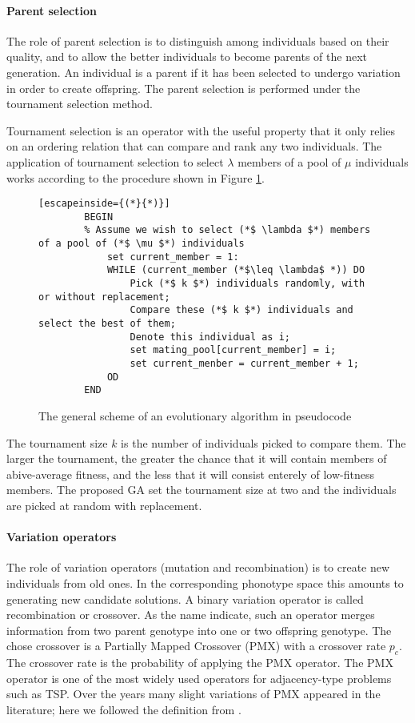 \documentclass[10pt,a4paper]{article}
\begin{document}
\paragraph*{Parent selection}
The role of parent selection is to distinguish among individuals based on their quality, and to allow the better individuals to become parents of the next generation. An individual is a parent if it has been selected to undergo variation in order to create offspring. The parent selection is performed under the tournament selection method. 

Tournament selection is an operator with the useful property that it only relies on an ordering relation that can compare and rank any two individuals. The application of tournament selection to select $\lambda$ members of a pool of $\mu$ individuals works according to the procedure shown in Figure \ref{fig:tournament}.
\begin{figure}[h!]
    \centering
    \begin{lstlisting}[escapeinside={(*}{*)}]
        BEGIN
        % Assume we wish to select (*$ \lambda $*) members of a pool of (*$ \mu $*) individuals
            set current_member = 1:
            WHILE (current_member (*$\leq \lambda$ *)) DO
                Pick (*$ k $*) individuals randomly, with or without replacement;
                Compare these (*$ k $*) individuals and select the best of them;
                Denote this individual as i;
                set mating_pool[current_member] = i;
                set current_menber = current_member + 1;
            OD 
        END
    \end{lstlisting}
    \label{fig:tournament}
\caption{The general scheme of an evolutionary algorithm in pseudocode}
\end{figure}

The tournament size $k$ is the number of individuals picked to compare them. The larger the tournament, the greater the chance that it will contain members of abive-average fitness, and the less that it will consist enterely of low-fitness members. The proposed GA set the tournament size at two and the individuals are picked at random with replacement.

\paragraph*{Variation operators}
The role of variation operators (mutation and recombination) is to create new individuals from old ones. In the corresponding phonotype space this amounts to generating new candidate solutions. A binary variation operator is called recombination or crossover. As the name indicate, such an operator merges information from two parent genotype into one or two offspring genotype. The chose crossover is a Partially Mapped Crossover (PMX) with a crossover rate $p_c$. The crossover rate is the probability of applying the PMX operator. The PMX operator is one of the most widely used operators for adjacency-type problems such as TSP. Over the years many slight variations of PMX appeared in the literature; here we followed the definition from \textcite{IntroEvComp}.
\end{document}
